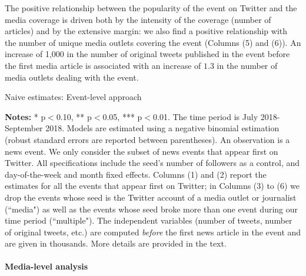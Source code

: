 The positive relationship between the popularity of the event on Twitter and the media coverage is driven both by the intensity of the coverage (number of articles) and by the extensive margin: we also find a positive relationship with the number of unique media outlets covering the event (Columns (5) and (6)). An increase of 1,000 in the number of original tweets published in the event before the first media article is associated with an increase of $1.3$ in the number of media outlets dealing with the event.


\begin{table}
\caption{Naive estimates: Event-level approach}
\begin{center}
	
\end{center}
\begin{spacing}{0.5}
	{\fns \textbf{Notes:} * p$<$0.10, ** p$<$0.05, *** p$<$0.01. The time period is July 2018-September 2018.  Models are estimated using a negative binomial estimation (robust standard errors are reported between parentheses). An observation is a news event. We only consider the subset of news events that appear first on Twitter. All specifications include the seed's number of followers as a control, and day-of-the-week and month fixed effects. Columns (1) and (2) report the estimates for all the events that appear first on Twitter; in Columns (3) to (6) we drop the events whose seed is the Twitter account of a media outlet or journalist (``media") as well as the events whose seed broke more than one event during our time period (``multiple"). The independent variables (number of tweets, number of original tweets, etc.) are computed \textit{before} the first news article in the event and are given in thousands. More details are provided in the text.} 
\end{spacing}
\label{Tab:number_articles_negbinomial_event}
\end{table} 


\paragraph{Media-level analysis}

